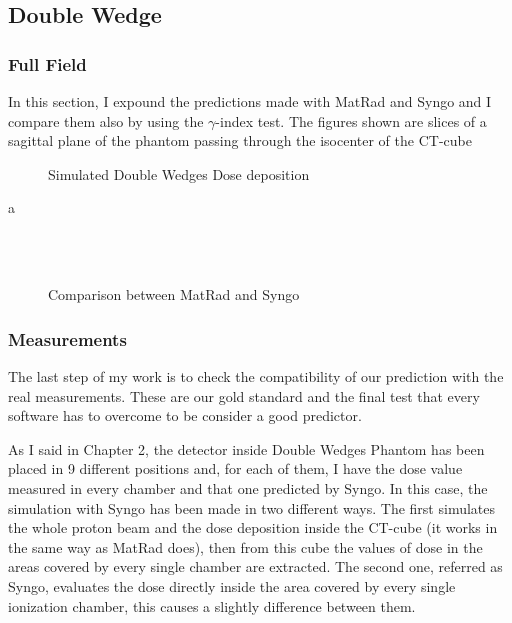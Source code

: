 \documentclass[12pt, a4paper, twoside]{book}
\begin{document}
\subsection{Double Wedge}
\subsubsection{Full Field}

In this section, I expound the predictions made with MatRad and Syngo and I compare them also by using the $\gamma$-index test. The figures shown are slices of a sagittal plane of the phantom passing through the isocenter of the CT-cube
\begin{figure}[!ht]
\centering
{} \quad
{} \quad
\caption{Simulated Double Wedges Dose deposition}
\label{fig:SyngoMat}
\end{figure}

a

\begin{figure}[t]
\centering
{} \\
 \\
 \quad
\caption{Comparison between MatRad and Syngo}
\label{fig:SyngoMat2}
\end{figure}

\subsubsection{Measurements}
The last step of my work is to check the compatibility of our prediction with the real measurements. These are our gold standard and the final test that every software has to overcome to be consider a good predictor.

As I said in Chapter 2, the detector inside Double Wedges Phantom has been placed in 9 different positions and, for each of them, I have the dose value measured in every chamber and that one predicted by Syngo. In this case, the simulation with Syngo has been made in two different ways. The first simulates the whole proton beam and the dose deposition inside the CT-cube (it works in the same way as MatRad does), then from this cube the values of dose in the areas covered by every single chamber are extracted. The second one, referred as Syngo, evaluates the dose directly inside the area covered by every single ionization chamber, this causes a slightly difference between them.
\end{document}

